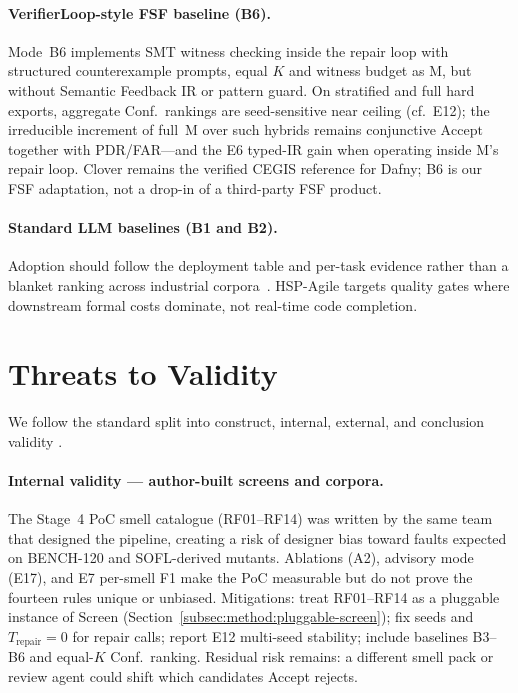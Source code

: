 \paragraph{VerifierLoop-style FSF baseline (B6).}
Mode~B6 implements SMT witness checking inside the repair loop with structured
counterexample prompts, equal $K$ and witness budget as M, but without
Semantic Feedback IR or pattern guard.
On stratified and full hard exports, aggregate Conf.\ rankings are
seed-sensitive near ceiling (cf.\ E12); the irreducible increment of full~M
over such hybrids remains conjunctive $\mathrm{Accept}$ together with
PDR/FAR---and the E6 typed-IR gain when operating inside M's repair loop.
Clover remains the verified CEGIS reference for Dafny; B6 is our FSF
adaptation, not a drop-in of a third-party FSF product.

\paragraph{Standard LLM baselines (B1 and B2).}
Adoption should follow the deployment table and per-task evidence rather than
a blanket ranking across industrial corpora~\citep{dakhel2023copilot,chen2021codex}.
HSP-Agile targets quality gates where downstream formal costs dominate, not
real-time code completion.


\section{Threats to Validity}
\label{sec:disc:threats}

We follow the standard split into construct, internal, external, and
conclusion validity
\cite{ammann2016testing,wohlin2012experimentation}.

\paragraph{Internal validity --- author-built screens and corpora.}
The Stage~4 PoC smell catalogue (RF01--RF14) was written by the same team that
designed the pipeline, creating a risk of designer bias toward faults expected
on BENCH-120 and SOFL-derived mutants.
Ablations (A2), advisory mode (E17), and E7 per-smell F1 make the PoC
measurable but do not prove the fourteen rules unique or unbiased.
Mitigations: treat RF01--RF14 as a pluggable instance of $\mathrm{Screen}$
(Section~\ref{subsec:method:pluggable-screen}); fix seeds and
$T_\text{repair}{=}0$ for repair calls; report E12 multi-seed stability;
include baselines B3--B6 and equal-$K$ Conf.\ ranking.
Residual risk remains: a different smell pack or review agent could shift
which candidates Accept rejects.

